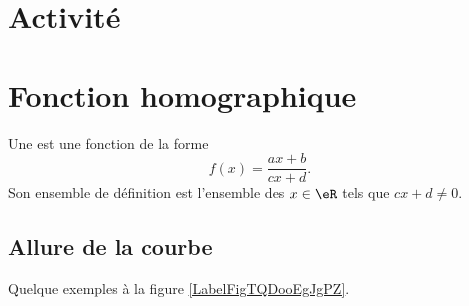 
\section*{Activité}



\section{Fonction homographique}

\begin{definition}
    Une  est une fonction de la forme
    \begin{equation}
        f(x)=\frac{ ax+b }{ cx+d }.
    \end{equation}
Son ensemble de définition est l'ensemble des \( x\in \eR\) tels que \( cx+d\neq 0\).
\end{definition}

\subsection{Allure de la courbe}



Quelque exemples à la figure \ref{LabelFigTQDooEgJgPZ}. %

\newpage

\newcommand{\CaptionFigTQDooEgJgPZ}{Des fonctions homographiques}


\clearpage


